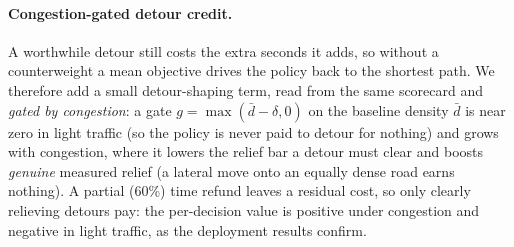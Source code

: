 \paragraph{Congestion-gated detour credit.} A worthwhile detour still costs the extra
seconds it adds, so without a counterweight a mean objective drives the policy back to the
shortest path. We therefore add a small detour-shaping term, read from the same scorecard
and \emph{gated by congestion}: a gate $g=\max(\bar d-\delta,0)$ on the baseline density
$\bar d$ is near zero in light traffic (so the policy is never paid to detour for nothing)
and grows with congestion, where it lowers the relief bar a detour must clear and boosts
\emph{genuine} measured relief (a lateral move onto an equally dense road earns nothing). A
partial (60\%) time refund leaves a residual cost, so only clearly relieving detours pay:
the per-decision value is positive under congestion and negative in light traffic, as the
deployment results confirm.

